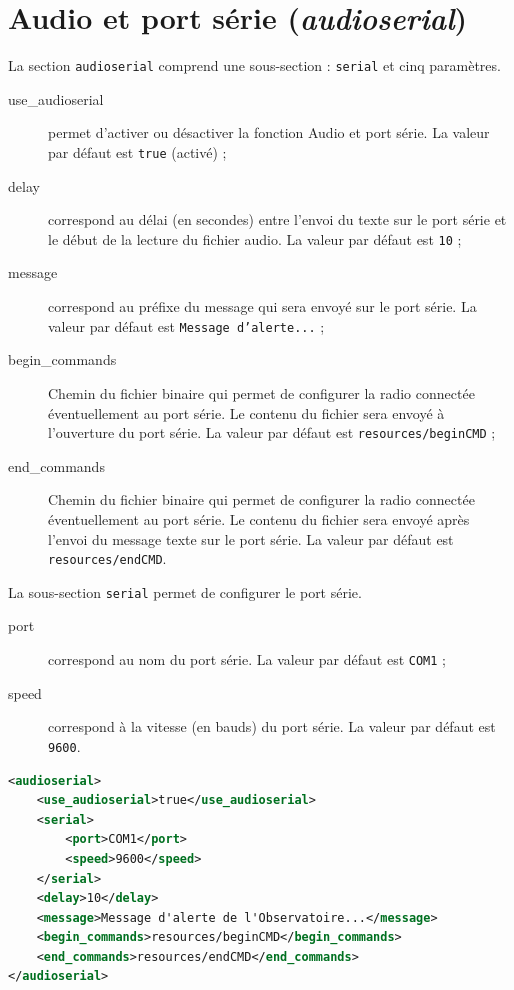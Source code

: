 \documentclass{article}
\begin{document}
\pagebreak
\section{Audio et port série (\emph{audioserial})}

La section \texttt{audioserial} comprend une sous-section : \texttt{serial} et cinq paramètres.

\begin{description}
    \item[use\_audioserial] permet d'activer ou désactiver la fonction Audio et port série. La valeur par défaut est \texttt{true} (activé) ;
    \item[delay] correspond au délai (en secondes) entre l'envoi du texte sur le port série et le début de la lecture du fichier audio. La valeur par défaut est \texttt{10} ;
    \item[message] correspond au préfixe du message qui sera envoyé sur le port série. La valeur par défaut est \texttt{Message d'alerte...} ;
    \item[begin\_commands] Chemin du fichier binaire qui permet de configurer la radio connectée éventuellement au port série. Le contenu du fichier sera envoyé à l'ouverture du port série. La valeur par défaut est \texttt{resources/beginCMD} ;
    \item[end\_commands] Chemin du fichier binaire qui permet de configurer la radio connectée éventuellement au port série. Le contenu du fichier sera envoyé après l'envoi du message texte sur le port série. La valeur par défaut est \texttt{resources/endCMD}.
\end{description}

La sous-section \texttt{serial} permet de configurer le port série.

\begin{description}
    \item[port] correspond au nom du port série. La valeur par défaut est \texttt{COM1} ;
    \item[speed] correspond à la vitesse (en bauds) du port série. La valeur par défaut est \texttt{9600}.
\end{description}

\begin{lstlisting}[language=xml,name=Aperçu de la section audioserial]
<audioserial>
    <use_audioserial>true</use_audioserial>
    <serial>
        <port>COM1</port>
        <speed>9600</speed>
    </serial>
    <delay>10</delay>
    <message>Message d'alerte de l'Observatoire...</message>
    <begin_commands>resources/beginCMD</begin_commands>
    <end_commands>resources/endCMD</end_commands>
</audioserial>
\end{lstlisting}
\end{document}
